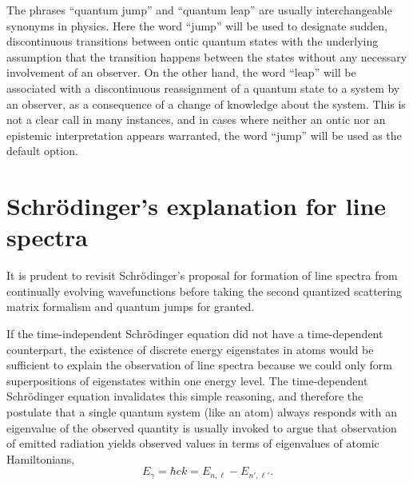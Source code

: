 \documentclass[final,3p,times,twocolumn]{elsarticle3}
\begin{document}
The phrases ``quantum jump'' and ``quantum leap'' are usually interchangeable
synonyms in physics. Here the word ``jump'' will be used to designate sudden,
discontinuous transitions between ontic quantum states with the underlying 
assumption that the transition happens between the states without any necessary 
involvement of an observer. On the other hand, the word ``leap'' will be 
associated with a discontinuous reassignment of a quantum state to a system 
by an observer, as a consequence of a change of knowledge about the system.
This is not a clear call in many instances, and in cases where neither an 
ontic nor an epistemic interpretation appears warranted, the word ``jump'' 
will be used as the default option.

\section{Schr\"odinger's explanation for line spectra}
\label{sec:erwin}

It is prudent to revisit Schr\"odinger's proposal for formation of line 
spectra from continually evolving wavefunctions before taking the second 
quantized scattering matrix formalism and quantum jumps for granted.

If the time-independent Schr\"odinger equation did not have a 
time-dependent counterpart, the existence of discrete energy eigenstates 
in atoms would be sufficient to explain the observation of line spectra 
because we could only form superpositions of eigenstates within one energy 
level. The time-dependent Schr\"odinger equation invalidates this simple 
reasoning, and therefore the postulate that a single quantum system (like 
an atom) always responds with an eigenvalue of the observed 
quantity \cite{vonNeumann} is usually invoked to argue that observation of
emitted radiation yields observed values in terms of eigenvalues of atomic
Hamiltonians,
\begin{equation}\label{eq:jump1}
E_\gamma=\hbar ck=E_{n,\ell}-E_{n',\ell'}.
\end{equation}
\end{document}

